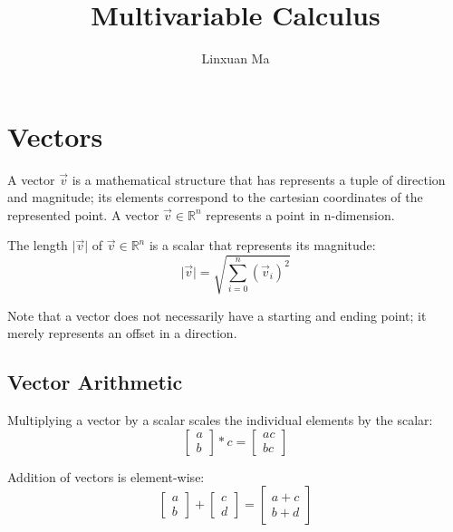 \documentclass[12pt]{article}
\title{Multivariable Calculus}
\author{Linxuan Ma}
\newcommand{\mov}[1]{\lvert \vec{#1} \rvert}
\newcommand{\RR}{\mathbb{R}}
\theoremstyle{definition}
\begin{document}
	\maketitle
	
	
	\section{Vectors}
	
	A vector $\vec{v}$ is a mathematical structure that has represents a tuple of direction and magnitude; its elements correspond to the cartesian coordinates of the represented point. A vector $\vec{v} \in \RR^n$ represents a point in n-dimension.
	
	The length $\mov{v}$ of $\vec{v} \in \RR^n$ is a scalar that represents its magnitude: $$\mov{v} = \sqrt{\sum_{i=0}^{n}(\vec{v}_i)^2}$$
	
	Note that a vector does not necessarily have a starting and ending point;  it merely represents an offset in a direction.
	
	\subsection{Vector Arithmetic}
	
	Multiplying a vector by a scalar scales the individual elements by the scalar:
	\begin{equation*}
		\begin{bmatrix}
			a \\ b
		\end{bmatrix} * c = 
		\begin{bmatrix}
			ac \\ bc
		\end{bmatrix}
	\end{equation*}
	
	Addition of vectors is element-wise:
	\begin{equation*}
	\begin{bmatrix}
		a \\ b
	\end{bmatrix} +
	\begin{bmatrix}
		c \\ d
	\end{bmatrix} =
	\begin{bmatrix}
		a + c \\ b + d
	\end{bmatrix}
	\end{equation*}
	
\end{document}
